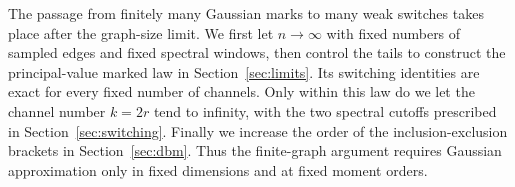 The passage from finitely many Gaussian marks to many weak switches
takes place after the graph-size limit. We first let \(n\to\infty\)
with fixed numbers of sampled edges and fixed spectral windows, then
control the tails to construct the principal-value marked law in
Section~\ref{sec:limits}. Its switching identities are exact for every
fixed number of channels. Only within this law do we let the channel
number \(k=2r\) tend to infinity, with the two spectral cutoffs prescribed
in Section~\ref{sec:switching}. Finally we increase the order of the
inclusion-exclusion brackets in Section~\ref{sec:dbm}. Thus the
finite-graph argument requires Gaussian approximation only in fixed
dimensions and at fixed moment orders.
